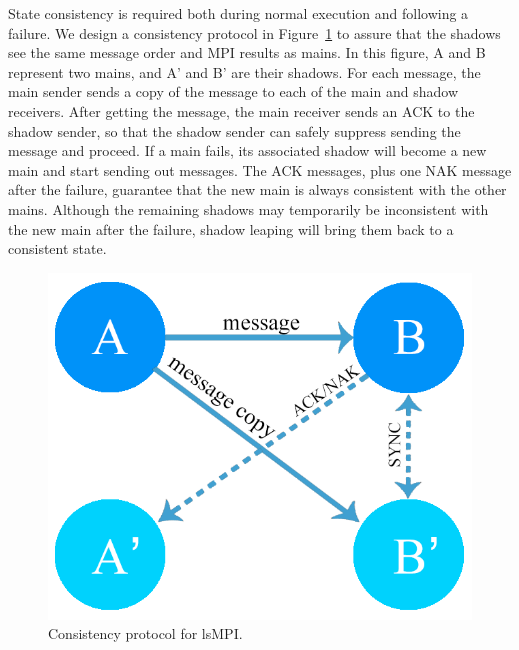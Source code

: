 State consistency is required both during normal execution and following a failure. %
We design a consistency protocol in Figure~\ref{fig:cons_protocol} to assure 
that the shadows see the same message order and MPI results as mains. In this figure, A and B represent two mains, and A' and B' are their shadows. For each message, the main sender sends a copy of the message to each of the main and shadow receivers. After getting the message, the main receiver sends an ACK to the shadow sender, so that the shadow sender can safely suppress sending the message and proceed. If a main fails,
its associated shadow will become a new main and start sending out messages. The ACK messages, plus one NAK message after the failure, guarantee that the new main is always consistent with the other mains. 
Although the remaining shadows may temporarily be inconsistent with the new main after the failure, shadow leaping will bring them back to a consistent state.

\begin{figure}[!t]
  \begin{center}
      \includegraphics[width=0.7\columnwidth]{Figures/cons_protocol}
  \end{center}
  \caption{Consistency protocol for lsMPI.}
  \label{fig:cons_protocol}
\end{figure}

